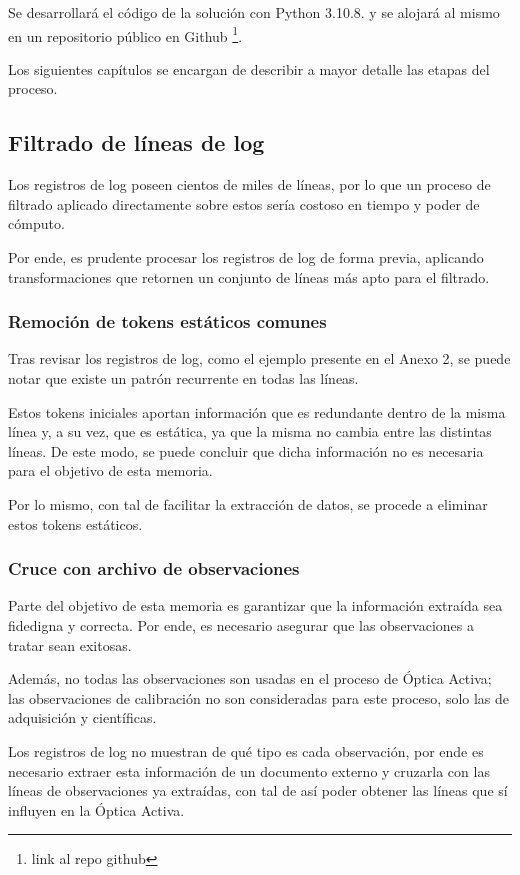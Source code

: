 Se desarrollará el código de la solución con Python 3.10.8. y se alojará al mismo en un repositorio público en Github \footnote{link al repo github}.

Los siguientes capítulos se encargan de describir a mayor detalle las etapas del proceso.

\subsection{Filtrado de líneas de log}

Los registros de log poseen cientos de miles de líneas, por lo que un proceso de filtrado aplicado directamente sobre estos sería costoso en tiempo y poder de cómputo.

Por ende, es prudente procesar los registros de log de forma previa, aplicando transformaciones que retornen un conjunto de líneas más apto para el filtrado.

\subsubsection{Remoción de tokens estáticos comunes}

Tras revisar los registros de log, como el ejemplo presente en el Anexo 2, se puede notar que existe un patrón recurrente en todas las líneas.

Estos tokens iniciales aportan información que es redundante dentro de la misma línea y, a su vez, que es estática, ya que la misma no cambia entre las distintas líneas. De este modo, se puede concluir que dicha información no es necesaria para el objetivo de esta memoria.

Por lo mismo, con tal de facilitar la extracción de datos, se procede a eliminar estos tokens estáticos.

\subsubsection{Cruce con archivo de observaciones}

Parte del objetivo de esta memoria es garantizar que la información extraída sea fidedigna y correcta. Por ende, es necesario asegurar que las observaciones a tratar sean exitosas.

Además, no todas las observaciones son usadas en el proceso de Óptica Activa; las observaciones de calibración no son consideradas para este proceso, solo las de adquisición y científicas.

Los registros de log no muestran de qué tipo es cada observación, por ende es necesario extraer esta información de un documento externo y cruzarla con las líneas de observaciones ya extraídas, con tal de así poder obtener las líneas que sí influyen en la Óptica Activa.


